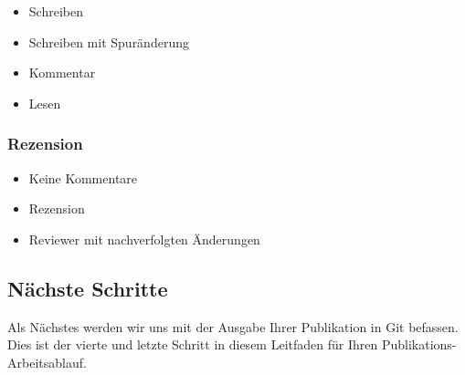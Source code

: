 \documentclass{article}
\begin{document}
\begin{itemize}
\item Schreiben


\item Schreiben mit Spuränderung


\item Kommentar


\item Lesen


\end{itemize}

\subsubsection{Rezension}\label{H6146355}


\begin{itemize}
\item Keine Kommentare


\item Rezension


\item Reviewer mit nachverfolgten Änderungen


\end{itemize}

\subsection{Nächste Schritte}\label{H8503735}



Als Nächstes werden wir uns mit der Ausgabe Ihrer Publikation in Git befassen. Dies ist der vierte und letzte Schritt in diesem Leitfaden für Ihren Publikations-Arbeitsablauf.
\end{document}
